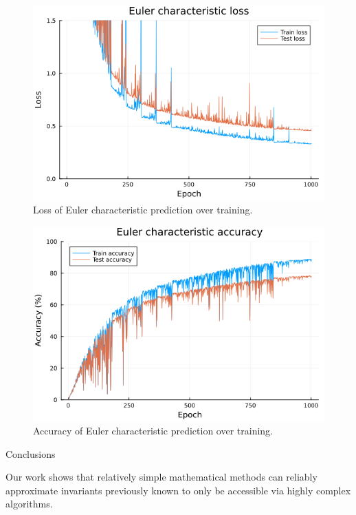 \documentclass[final,20pt]{beamer}
\newlength{\colwidth}
\begin{document}
\begin{frame}[t]
\begin{columns}[t]
\begin{column}{\colwidth}
\begin{block}
    \begin{figure}
    \includegraphics{chi-loss.png}
    \caption{Loss of Euler characteristic prediction over training.}
    \end{figure}

    \begin{figure}
    \includegraphics{chi-accuracy.png}
    \caption{Accuracy of Euler characteristic prediction over training.}
    \end{figure}

    \end{block}

  \begin{exampleblock}{Conclusions}

    Our work shows that relatively simple mathematical methods
    can reliably approximate invariants previously known to only be accessible
    via highly complex algorithms.


\end{exampleblock}
\end{column}
\end{columns}
\end{frame}
\end{document}
